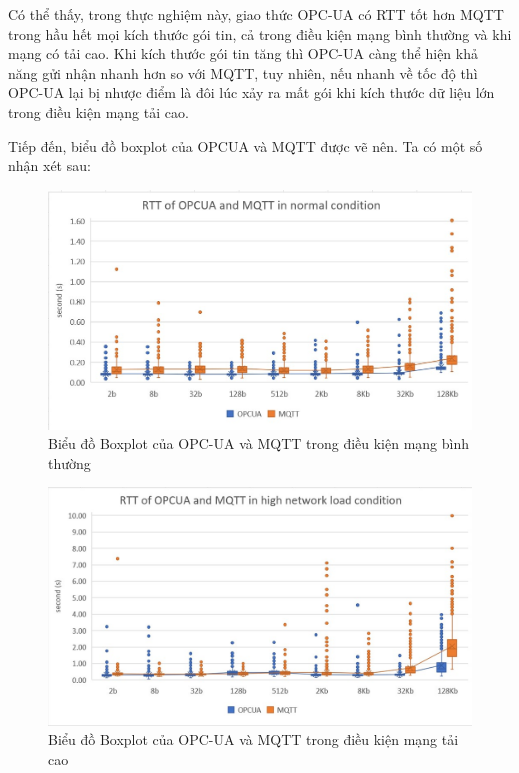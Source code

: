 Có thể thấy, trong thực nghiệm này, giao thức OPC-UA có RTT tốt hơn MQTT trong hầu hết mọi kích thước gói tin, cả trong điều kiện mạng bình thường và khi mạng có tải cao. Khi kích thước gói tin tăng thì OPC-UA càng thể hiện khả năng gửi nhận nhanh hơn so với MQTT, tuy nhiên, nếu nhanh về tốc độ thì OPC-UA lại bị nhược điểm là đôi lúc xảy ra mất gói khi kích thước dữ liệu lớn trong điều kiện mạng tải cao.

Tiếp đến, biểu đồ boxplot của OPCUA và MQTT được vẽ nên. Ta có một số nhận xét sau:

\newpage

\begin{figure}[!h]
    \centering
    \includegraphics[width=1\textwidth]{Images/Comparing_experiment/comp_opc_mqtt_2.jpg}
    \caption{Biểu đồ Boxplot của OPC-UA và MQTT trong điều kiện mạng bình thường}
    \label{fig:comp_opc_mqtt_2}
\end{figure}

\begin{figure}[!h]
    \centering
    \includegraphics[width=1\textwidth]{Images/Comparing_experiment/comp_opc_mqtt_3.jpg}
    \caption{Biểu đồ Boxplot của OPC-UA và MQTT trong điều kiện mạng tải cao}
    \label{fig:comp_opc_mqtt_3}
\end{figure}

